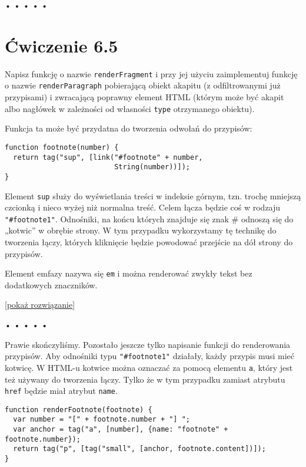 \begin{center}
• • • • •
\end{center}

  
\section*{Ćwiczenie 6.5}
\label{sec:6.5}
  
    
Napisz funkcję o nazwie \texttt{renderFragment} i przy jej użyciu zaimplementuj funkcję o nazwie \texttt{renderParagraph} pobierającą obiekt akapitu (z odfiltrowanymi już przypisami) i zwracającą poprawny element HTML (którym może być akapit albo nagłówek w zależności od własności \texttt{type} otrzymanego obiektu).

    
Funkcja ta może być przydatna do tworzenia odwołań do przypisów:

    
\begin{verbatim} 
function footnote(number) {
  return tag("sup", [link("#footnote" + number,
                          String(number))]);
}
\end{verbatim}
    
Element \texttt{sup} służy do wyświetlania treści w indeksie górnym, tzn. trochę mniejszą czcionką i nieco wyżej niż normalna treść. Celem łącza będzie coś w rodzaju \texttt{"\#footnote1"}. Odnośniki, na końcu których znajduje się znak \# odnoszą się do „kotwic” w obrębie strony. W tym przypadku wykorzystamy tę technikę do tworzenia łączy, których kliknięcie będzie powodować przejście na dół strony do przypisów.

    
Element emfazy nazywa się \texttt{em} i można renderować zwykły tekst bez dodatkowych znaczników.

  
[\hyperref[sol:6.5]{pokaż rozwiązanie}]
  


\begin{center}
• • • • •
\end{center}

  
Prawie skończyliśmy. Pozostało jeszcze tylko napisanie funkcji do renderowania przypisów. Aby odnośniki typu \texttt{"\#footnote1"} działały, każdy przypis musi mieć kotwicę. W HTML-u kotwice można oznaczać za pomocą elementu \texttt{a}, który jest też używany do tworzenia łączy. Tylko że w tym przypadku zamiast atrybutu \texttt{href} będzie miał atrybut \texttt{name}.

  
\begin{verbatim} 
function renderFootnote(footnote) {
  var number = "[" + footnote.number + "] ";
  var anchor = tag("a", [number], {name: "footnote" + footnote.number});
  return tag("p", [tag("small", [anchor, footnote.content])]);
}
 \end{verbatim}
  
